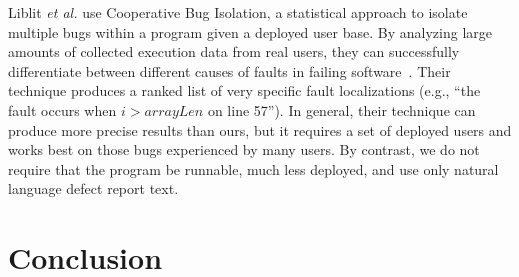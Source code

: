 \documentclass[conference]{IEEEtran}
\begin{document}
Liblit \textit{et al.} use Cooperative Bug Isolation, a statistical
approach to isolate multiple bugs within a program given a deployed user
base. By analyzing large amounts of collected execution data from real
users, they can successfully differentiate between different causes of
faults in failing software~\cite{liblit05}. Their technique produces
a ranked list of very specific fault localizations (e.g., ``the fault
occurs when $i > arrayLen$ on line 57''). In general, their technique
can produce more precise results than ours, but it requires a set of
deployed users and works best on those bugs experienced by many users.
By contrast, we do not require that the program be runnable, much less
deployed, and use only natural language defect report text.

\section{Conclusion}



\end{document}
